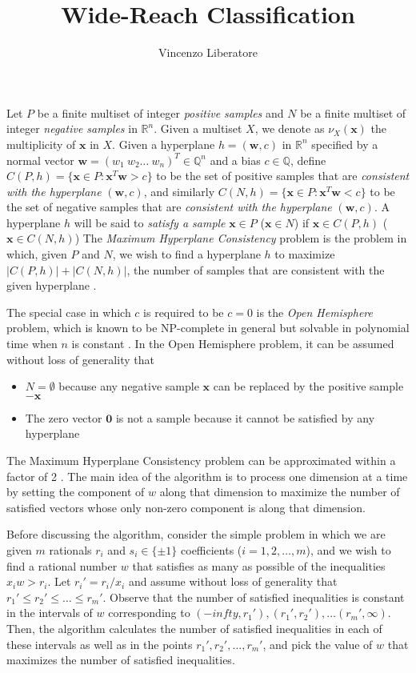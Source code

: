 \documentclass[11pt]{article}
\title{Wide-Reach Classification}
\author{Vincenzo Liberatore}
\theoremstyle{definition}
\newcommand{\R}{\mathbb{R}}
\newcommand{\Q}{\mathbb{Q}}
\newcommand{\vect}[1]{\mathbf{#1}}
\begin{document}
\maketitle

Let $P$ be a finite multiset of integer {\em positive samples\/} and 
$N$ be a finite multiset of integer {\em negative samples\/} in $\R^n$.
Given a multiset $X$, we denote as $\nu_X(\vect{x})$ the multiplicity of $\vect{x}$ in $X$. 
Given a hyperplane $h = (\vect{w}, c)$ in $\R^n$ 
specified by a normal vector $\vect{w} = (w_1 ~ w_2 \dots ~ w_n)^T \in \Q^n$ and a bias $c \in \Q$,
define $C(P, h) = \{ \vect{x} \in P : \vect{x}^T \vect{w} > c \}$
to be the set of positive samples that are {\em consistent with the hyperplane\/} $(\vect{w}, c)$,
and similarly $C(N, h) = \{ \vect{x} \in P : \vect{x}^T \vect{w} < c \}$
to be the set of negative samples that are {\em consistent with the hyperplane\/} $(\vect{w}, c)$.
A hyperplane $h$ will be said to {\em satisfy a sample\/} 
$\vect{x} \in P$ ($\vect{x} \in N$)
if $\vect{x} \in C(P, h)$ ($\vect{x} \in C(N, h)$)
The {\em Maximum Hyperplane Consistency\/} problem is the problem in which,
given $P$ and $N$, we wish to find a hyperplane $h$
to maximize $|C(P, h)| + |C(N, h)|$, the number of samples 
that are consistent with the given hyperplane \cite{countingapprox}.

\iffalse
The special case in which $c$ is required to be $c = 0$ is the {\em Open Hemisphere\/} problem,
which is known to be NP-complete in general but solvable in polynomial time
when $n$ is constant \cite{openhemisphere}.
In the Open Hemisphere problem, it can be assumed without loss of generality that 
\begin{itemize} 
\item $N = \emptyset$ because 
any negative sample $\vect{x}$ can be replaced by the positive sample $-\vect{x}$
\item The zero vector $\vect{0}$ is not a sample because it cannot be satisfied by any hyperplane
\end{itemize}

The Maximum Hyperplane Consistency problem can be approximated within a factor of 2 \cite{mhc}.
The main idea of the algorithm is to process one dimension at a time 
by setting the component of $w$ along that dimension to maximize the number of satisfied vectors
whose only non-zero component is along that dimension.

Before discussing the algorithm, 
consider the simple problem in which we are given $m$ rationals $r_i$ and 
$s_i \in \{ \pm 1 \}$ coefficients ($i = 1, 2, \dots, m$),
and we wish to find a rational number $w$ that satisfies as many as possible of the inequalities
$x_i w > r_i$.
Let $r_i' = r_i / x_i$ and assume without loss of generality that 
$r_1' \leq r_2' \leq \dots \leq r_m'$.
Observe that the number of satisfied inequalities is constant in the 
intervals of $w$ corresponding to
$(-infty, r_1'), (r_1', r_2'), \dots (r_m', \infty)$.
Then, the algorithm calculates the number of satisfied inequalities in each of these intervals 
as well as in the points $r_1', r_2', \dots, r_m'$, and pick the
value of $w$ that maximizes the number of satisfied inequalities. 
\end{document}
